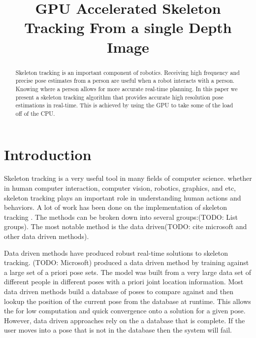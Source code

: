 \documentclass[conference]{IEEEtran}
\begin{document}
\title{GPU Accelerated Skeleton Tracking From a single Depth Image}

\author{
}

\maketitle

\begin{abstract}
Skeleton tracking is an important component of robotics. Receiving high frequency and precise pose estimates from a person are useful when a robot interacts with a person. Knowing where a person allows for more accurate real-time planning. In this paper we present a skeleton tracking algorithm that provides accurate high resolution pose estimations in real-time. This is achieved by using the GPU to take some of the load off of the CPU.
\end{abstract}

\IEEEpeerreviewmaketitle

\section{Introduction}
Skeleton tracking is a very useful tool in many fields of computer science. whether in human computer interaction, computer vision, robotics, graphics, and etc, skeleton tracking plays an important role in understanding human actions and behaviors. A lot of work has been done on the implementation of skeleton tracking \cite{Ganapathi2010,Bleiweiss2009,Baak2011,Plagemann2010,Knoop2009}. The methods can be broken down into several groups:(TODO: List groups). The most notable method is the data driven\cite{Baak2011}(TODO: cite microsoft and other data driven methods).

Data driven methods have produced robust real-time solutions to skeleton tracking\cite{Baak2011}. (TODO: Microsoft) produced a data driven method by training against a large set of a priori pose sets. The model was built from a very large data set of different people in different poses with a priori joint location information. Most data driven methods build a database of poses to compare against and then lookup the position of the current pose from the database at runtime. This allows the for low computation and quick convergence onto a solution for a given pose. However, data driven approaches rely on the a database that is complete. If the user moves into a pose that is not in the database then the system will fail.
\end{document}
